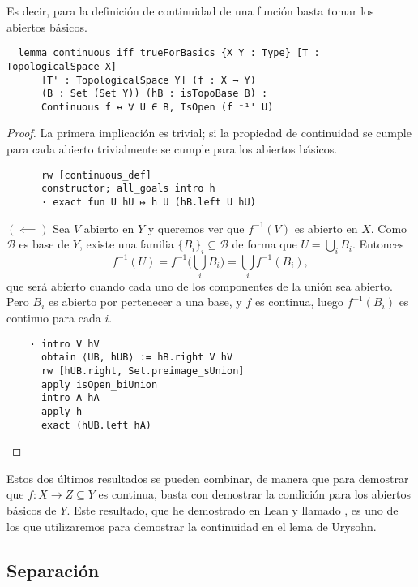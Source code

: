 Es decir, para la definición de continuidad de una función basta tomar los abiertos básicos.

\begin{lstlisting}
  lemma continuous_iff_trueForBasics {X Y : Type} [T : TopologicalSpace X]
      [T' : TopologicalSpace Y] (f : X → Y)
      (B : Set (Set Y)) (hB : isTopoBase B) :
      Continuous f ↔ ∀ U ∈ B, IsOpen (f ⁻¹' U)
\end{lstlisting}

\begin{proof}
  La primera implicación es trivial; si la propiedad de continuidad se cumple para cada abierto trivialmente se cumple para los abiertos básicos.

  \begin{lstlisting}
      rw [continuous_def]
      constructor; all_goals intro h
      · exact fun U hU ↦ h U (hB.left U hU) \end{lstlisting}

  $(\impliedby)$ Sea $V$ abierto en $Y$ y queremos ver que $f^{-1}(V)$ es abierto en $X$. Como $\mathcal{B}$ es base de $Y$, existe una familia $\{B_i\}_i \subseteq \mathcal{B}$ de forma que $U = \bigcup_i B_i$. Entonces $$
  f^{-1}(U) = f^{-1}\big(\bigcup_i B_i\big) = \bigcup_i f^{-1}(B_i),
  $$
  que será abierto cuando cada uno de los componentes de la unión sea abierto. Pero $B_i$ es abierto por pertenecer a una base, y $f$ es continua, luego $f^{-1}(B_i)$ es continuo para cada $i$.

  \begin{lstlisting}
    · intro V hV
      obtain ⟨UB, hUB⟩ := hB.right V hV
      rw [hUB.right, Set.preimage_sUnion]
      apply isOpen_biUnion
      intro A hA
      apply h
      exact (hUB.left hA) \end{lstlisting}

\end{proof}

Estos dos últimos resultados se pueden combinar, de manera que para demostrar que $f : X \to Z \subseteq Y$ es continua, basta con demostrar la condición para los abiertos básicos de $Y$. Este resultado, que he demostrado en Lean y llamado , es uno de los que utilizaremos para demostrar la continuidad en el lema de Urysohn.


\subsection{Separación}

